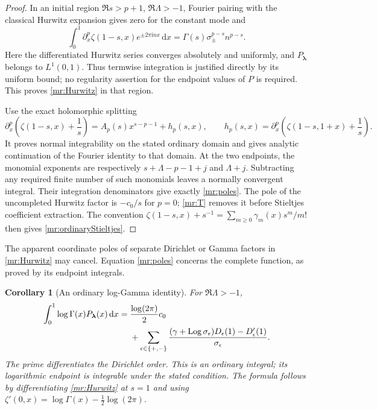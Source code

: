 \documentclass[11pt]{article}
\numberwithin{equation}{section}
\theoremstyle{plain}
\newtheorem{corollary}[theorem]{Corollary}
\theoremstyle{definition}
\theoremstyle{remark}
\DeclareMathOperator{\Log}{Log}
\newcommand{\ii}{\mathrm i}
\newcommand{\dd}{\,\mathrm d}
\begin{document}
\begin{proof}
In an initial region $\Re s>p+1$, $\Re\Lambda>-1$, Fourier pairing
with the classical Hurwitz expansion \cite[Eq.~25.11.9]{dlmf:hurwitz}
gives zero for the constant mode and
\[
 \int_0^1\partial_x^p\zeta(1-s,x)e^{\pm2\pi\ii nx}\dd x
       =\Gamma(s)\sigma_\pm^{p-s}n^{p-s}.
\]
Here the differentiated Hurwitz series converges absolutely and
uniformly, and $P_{\boldsymbol\lambda}$ belongs to $L^1(0,1)$.
Thus termwise integration is justified directly by its uniform bound;
no regularity assertion for the endpoint values of $P$ is required.
This proves \eqref{mr:Hurwitz} in that region.

Use the exact holomorphic splitting
\begin{equation}\label{mr:split}
 \partial_x^p\left(\zeta(1-s,x)+\frac1s\right)
      =A_p(s)x^{s-p-1}+h_p(s,x),\qquad
 h_p(s,x)=\partial_x^p\left(\zeta(1-s,1+x)+\frac1s\right).
\end{equation}
It proves normal integrability on the stated ordinary domain and gives
analytic continuation of the Fourier identity to that domain. At the
two endpoints, the monomial exponents are respectively
$s+\Lambda-p-1+j$ and $\Lambda+j$. Subtracting any required finite
number of such monomials leaves a normally convergent integral.
Their integration denominators give exactly \eqref{mr:poles}.
The pole of the uncompleted Hurwitz factor is $-c_0/s$ for $p=0$;
\eqref{mr:T} removes it before Stieltjes coefficient extraction.
The convention
$\zeta(1-s,x)+s^{-1}=\sum_{m\ge0}\gamma_m(x)s^m/m!$
then gives \eqref{mr:ordinaryStieltjes}.
\end{proof}

The apparent coordinate poles of separate Dirichlet or Gamma factors
in \eqref{mr:Hurwitz} may cancel. Equation \eqref{mr:poles} concerns
the complete function, as proved by its endpoint integrals.

\begin{corollary}[An ordinary log-Gamma identity]
\label{mr:loggamma}
For $\Re\Lambda>-1$,
\begin{align}
 \int_0^1\log\Gamma(x)P_{\boldsymbol\lambda}(x)\dd x
 ={}&\frac{\log(2\pi)}2c_0\notag\\
 &+\sum_{\epsilon\in\{+,-\}}
     \frac{(\gamma+\Log\sigma_\epsilon)D_\epsilon(1)
                                     -D_\epsilon'(1)}{\sigma_\epsilon}.
       \label{mr:logGamma}
\end{align}
The prime differentiates the Dirichlet order. This is an ordinary
integral; its logarithmic endpoint is integrable under the stated
condition. The formula follows by differentiating \eqref{mr:Hurwitz}
at $s=1$ and using
$\zeta'(0,x)=\log\Gamma(x)-\tfrac12\log(2\pi)$.
\end{corollary}
\end{document}
